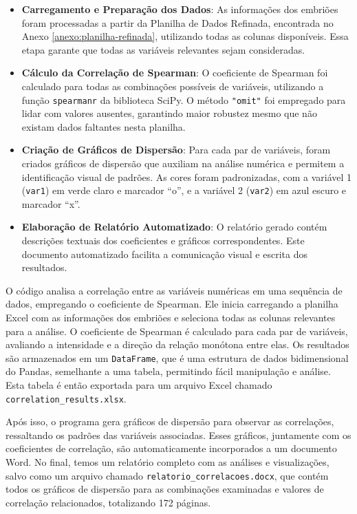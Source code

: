 \begin{itemize}
    \item \textbf{Carregamento e Preparação dos Dados}: As informações dos embriões foram processadas a partir da Planilha de Dados Refinada, encontrada no Anexo \ref{anexo:planilha-refinada}, utilizando todas as colunas disponíveis. Essa etapa garante que todas as variáveis relevantes sejam consideradas.
    \item \textbf{Cálculo da Correlação de Spearman}: O coeficiente de Spearman foi calculado para todas as combinações possíveis de variáveis, utilizando a função \texttt{spearmanr} da biblioteca SciPy. O método \texttt{"omit"} foi empregado para lidar com valores ausentes, garantindo maior robustez mesmo que não existam dados faltantes nesta planilha.
    \item \textbf{Criação de Gráficos de Dispersão}: Para cada par de variáveis, foram criados gráficos de dispersão que auxiliam na análise numérica e permitem a identificação visual de padrões. As cores foram padronizadas, com a variável 1 (\texttt{var1}) em verde claro e marcador ``o'', e a variável 2 (\texttt{var2}) em azul escuro e marcador ``x''.
    \item \textbf{Elaboração de Relatório Automatizado}: O relatório gerado contém descrições textuais dos coeficientes e gráficos correspondentes. Este documento automatizado facilita a comunicação visual e escrita dos resultados.
\end{itemize}

O código analisa a correlação entre as variáveis numéricas em uma sequência de dados, empregando o coeficiente de Spearman. Ele inicia carregando a planilha Excel com as informações dos embriões e seleciona todas as colunas relevantes para a análise. O coeficiente de Spearman é calculado para cada par de variáveis, avaliando a intensidade e a direção da relação monótona entre elas. Os resultados são armazenados em um \texttt{DataFrame}, que é uma estrutura de dados bidimensional do Pandas, semelhante a uma tabela, permitindo fácil manipulação e análise. Esta tabela é então exportada para um arquivo Excel chamado \texttt{correlation\_results.xlsx}.

Após isso, o programa gera gráficos de dispersão para observar as correlações, ressaltando os padrões das variáveis associadas. Esses gráficos, juntamente com os coeficientes de correlação, são automaticamente incorporados a um documento Word. No final, temos um relatório completo com as análises e visualizações, salvo como um arquivo chamado \texttt{relatorio\_correlacoes.docx}, que contém todos os gráficos de dispersão para as combinações examinadas e valores de correlação relacionados, totalizando 172 páginas. 

